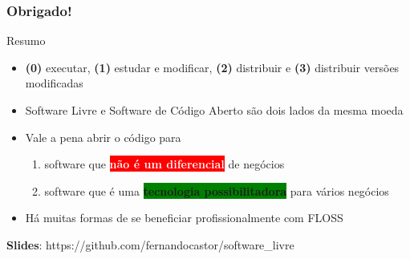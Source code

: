 \documentclass[xcolor=dvipsnames]{beamer}
\newcommand{\bred}[1]{\colorbox{red}{\textcolor{white}{#1}}}
\newcommand{\bgreen}[1]{\colorbox{green}{#1}}
\begin{document}
\begin{frame}
	\frametitle{Obrigado!}
\begin{block}{Resumo}
\begin{itemize}
\item {\bf (0)} executar, {\bf (1)} estudar e modificar, {\bf (2)} distribuir e {\bf (3)} distribuir versões modificadas
\item Software Livre e Software de Código Aberto são dois lados da mesma moeda 
\item Vale a pena abrir o código para\vspace{0.1cm}
	\begin{enumerate}
	\item software que \bred{\textbf{não é um diferencial}} de negócios
	\item software que é uma \bgreen{\textbf{tecnologia possibilitadora}} para vários negócios
	\end{enumerate}
\item Há muitas formas de se beneficiar profissionalmente com FLOSS
\end{itemize}
\end{block}
\textbf{Slides}: https://github.com/fernandocastor/software\_livre

\end{frame}
\end{document}
